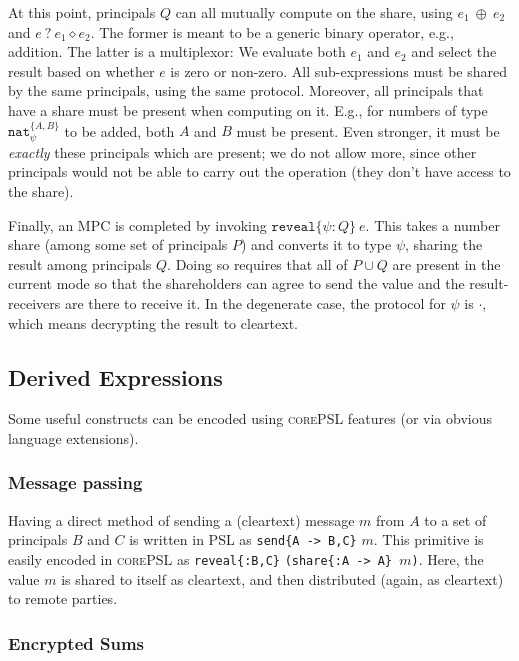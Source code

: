 \documentclass[10pt]{article}
\newcommand{\kw}[1]{\ensuremath{\mathtt{#1}}}
\newcommand{\tnat}{\ensuremath{\mathtt{nat}}}
\newcommand{\ebinop}[2]{\ensuremath{{#1}~\oplus~{#2}}}
\newcommand{\ereveal}[3]{\ensuremath{\kw{reveal}\{{#1}\!:\!{#2}\}~{#3}}}
\newcommand{\emux}[3]{\ensuremath{{#1}~\kw{?}~{#2} \diamond {#3}}}
\newcommand{\lang}{\textsc{corePSL}\xspace}
\begin{document}
At this point, principals $Q$ can all mutually compute on the share,
using $\ebinop{e_1}{e_2}$ and $\emux{e}{e_1}{e_2}$. The former is
meant to be a generic binary operator, e.g., addition. The latter is a
multiplexor: We evaluate both $e_1$ and $e_2$ and select the result
based on whether $e$ is zero or non-zero. All sub-expressions must be
shared by the same principals, using the same protocol. Moreover, all
principals that have a share must be present when computing on
it. E.g., for numbers of type $\tnat^{\{A,B\}}_\psi$ to be added, both
$A$ and $B$ must be present. Even stronger, it must be \emph{exactly}
these principals which are present; we do not allow more, since other
principals would not be able to carry out the operation (they don't
have access to the share).

Finally, an MPC is completed by invoking $\ereveal{\psi}{Q}{e}$. This
takes a number share (among some set of principals $P$) and converts
it to type $\psi$, sharing the result among principals $Q$. Doing so
requires that all of $P \cup Q$ are present in the current mode so
that the shareholders can agree to send the value and the
result-receivers are there to receive it. In the degenerate case, the
protocol for $\psi$ is $\cdot$, which means decrypting the result to
cleartext. 

\subsection{Derived Expressions}
\label{sec:derived}

Some useful constructs can be encoded using \lang features (or via
obvious language extensions). 

\subsubsection{Message passing}

Having a direct method of sending a (cleartext) message $m$ from $A$
to a set of principals $B$ and $C$ is written in PSL as \texttt{send\{A
    -> B,C\}} $m$. This primitive is easily encoded in \lang as
  \verb+reveal{:B,C}+ \verb+(share{:A -> A} +$m$\verb+)+.
Here, the value $m$ is shared to itself as cleartext, and then
distributed (again, as cleartext) to remote parties.

\subsubsection{Encrypted Sums}
\end{document}

